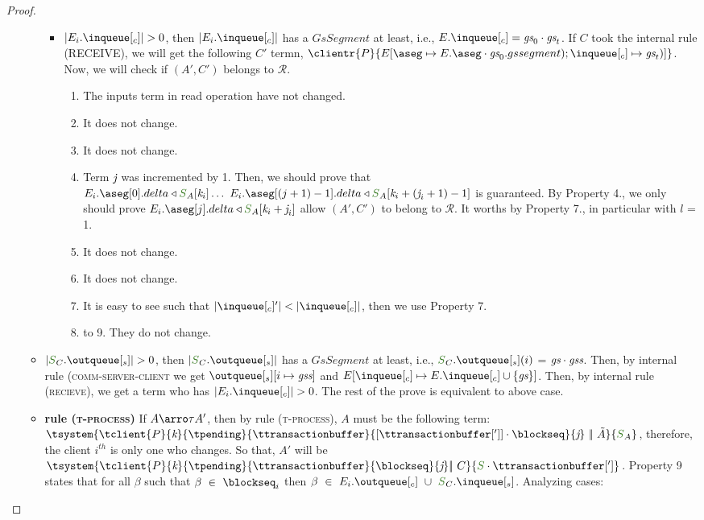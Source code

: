 \documentclass[envcountsect,runningheads,orivec]{llncs}
\begin{document}
\begin{proof}
\begin{itemize}
\begin{itemize}
						\begin{itemize}
							\item $|E_{i}.\inclient| > 0$, then $|E_{i}.\inclient|$ has a $GsSegment$ at least, i.e., $E.\inclient = \gs_0 \cdot \gs_t$. If $C$ took the internal rule (\textsc{\footnotesize{RECEIVE}}), we will get the following $C'$ termn, $\clientr{P}{\updatetwo{E}{\receivebuffer}{E.\receivebuffer \cdot \gs_0.gssegment)}{\inclient}{\gs_t)}}$. Now, we will check if $(A',C')$ belongs to $\mathcal{R}$.
							
							\begin{enumerate}
								\item The inputs term in read operation have not changed.
								\item It does not change.
								\item It does not change.
								\item Term $\textit{j}$ was incremented by 1. Then, we should prove that $E_{i}.\receivebuffer[0].delta \triangleleft \queuemessage_A[\tknown_i] \ldots\ E_{i}.\receivebuffer[(j+1) - 1].delta \triangleleft \queuemessage_A[\tknown_i + (\treceivebuffer_i+1) - 1]$ is guaranteed. By Property 4., we only should prove $E_{i}.\receivebuffer[j].delta \triangleleft \queuemessage_A[\tknown_i + \treceivebuffer_i]$ allow $(A',C')$ to belong to $\mathcal{R}$. It worths by Property 7., in particular with $l$ = 1.  
								\item It does not change.
								\item It does not change.
							  \item It is easy to see such that $|\inclient'| < |\inclient|$, then we use Property 7.
								\item to 9. They do not change.
							\end{enumerate}
						\end{itemize}
					\item $|\queuemessage_C.\outserver| > 0$, then $|\queuemessage_C.\outserver|$ has a $GsSegment$ at least, i.e., $\queuemessage_C.\outserver(i)$ = $\textit{gs} \cdot \textit{gss}$. Then, by internal rule (\textsc{\footnotesize{comm-server-client}} we get $\update{\outserver}{i}{\gss}$ and $\update{E}{\inclient}{E.\inclient \cup \{\gs\}}$. Then, by internal rule (\textsc{\footnotesize{recieve}}), we get a term who has $|E_{i}.\inclient| > 0$. The rest of the prove is equivalent to above case.
						
\item {\bf rule (\textsc{t-process})} If $A \arroi{\tau} A'$, then by rule (\textsc{\footnotesize{t-process}}), $A$ must be the following term: $\tsystem{\tclient{\tprogram}{\tknown}{\tpending}{\ttransactionbuffer}{[\tsenthead] \cdot \tsent}{\treceivebuffer}\ \bigpar\ \tilde{A}}{\queuemessage_A}$, therefore, the client $i^{th}$ is only one who changes. So that, $A'$ will be $\tsystem{\tclient{\tprogram}{\tknown}{\tpending}{\ttransactionbuffer}{\tsent}{\treceivebuffer}\bigpar\ C}{\queuemessage \cdot \tsenthead}$. Property 9 states that for all $\beta$ such that $\beta \ \in \ \tsent_i$ then $\beta \ \in \ E_{i}.\outclient \ \cup \ \queuemessage_C.\inserver$. Analyzing cases:
					

\end{itemize}
\end{itemize}
\end{proof}
\end{document}
